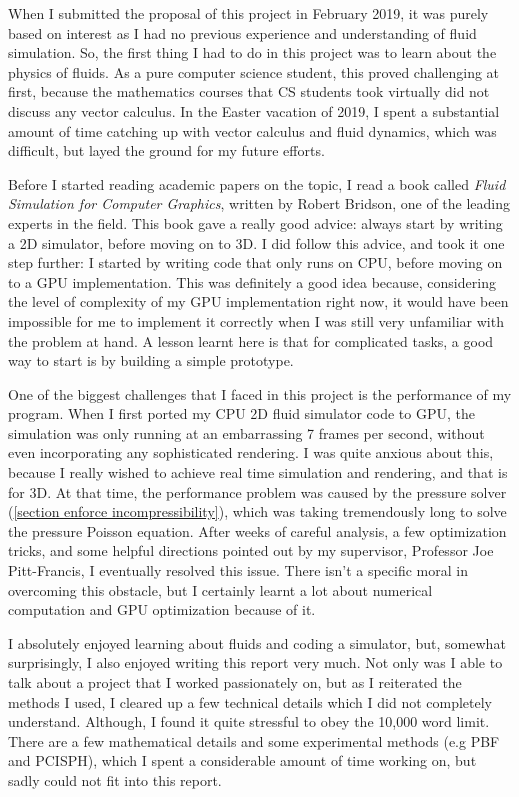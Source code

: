When I submitted the proposal of this project in February 2019, it was purely based on interest as I had no previous experience and understanding of fluid simulation. So, the first thing I had to do in this project was to learn about the physics of fluids. As a pure computer science student, this proved challenging at first, because the mathematics courses that CS students took virtually did not discuss any vector calculus. In the Easter vacation of 2019, I spent a substantial amount of time catching up with vector calculus and fluid dynamics, which was difficult, but layed the ground for my future efforts.

Before I started reading academic papers on the topic, I read a book called \textit{Fluid Simulation for Computer Graphics}\cite{bridson2015fluid}, written by Robert Bridson, one of the leading experts in the field. This book gave a really good advice: always start by writing a 2D simulator, before moving on to 3D. I did follow this advice, and took it one step further: I started by writing code that only runs on CPU, before moving on to a GPU implementation. This was definitely a good idea because, considering the level of complexity of my GPU implementation right now, it would have been impossible for me to implement it correctly when I was still very unfamiliar with the problem at hand. A lesson learnt here is that for complicated tasks, a good way to start is by building a simple prototype.

One of the biggest challenges that I faced in this project is the performance of my program. When I first ported my CPU 2D fluid simulator code to GPU, the simulation was only running at an embarrassing 7 frames per second, without even incorporating any sophisticated rendering. I was quite anxious about this, because I really wished to achieve real time simulation and rendering, and that is for 3D. At that time, the performance problem was caused by the pressure solver (\ref{section enforce incompressibility}), which was taking tremendously long to solve the pressure Poisson equation. After weeks of careful analysis, a few optimization tricks, and some helpful directions pointed out by my supervisor, Professor Joe Pitt-Francis, I eventually resolved this issue. There isn't a specific moral in overcoming this obstacle, but I certainly learnt a lot about numerical computation and GPU optimization because of it.

I absolutely enjoyed learning about fluids and coding a simulator, but, somewhat surprisingly, I also enjoyed writing this report very much. Not only was I able to talk about a project that I worked passionately on, but as I reiterated the methods I used, I cleared up a few technical details which I did not completely understand. Although, I found it quite stressful to obey the 10,000 word limit. There are a few mathematical details and some experimental methods (e.g PBF and PCISPH), which I spent a considerable amount of time working on, but sadly could not fit into this report.

